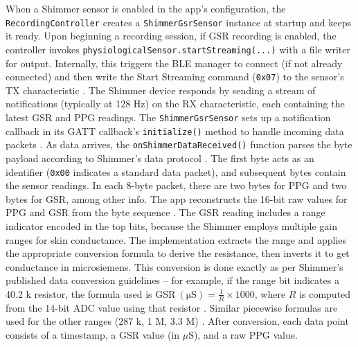 When a Shimmer sensor is enabled in the app's configuration, the \texttt{RecordingController} creates a \texttt{ShimmerGsrSensor} instance at startup and keeps it ready. Upon beginning a recording session, if GSR recording is enabled, the controller invokes \texttt{physiologicalSensor.startStreaming(...)} with a file writer for output. Internally, this triggers the BLE manager to connect (if not already connected) and then write the Start Streaming command (\texttt{0x07}) to the sensor's TX characteristic \cite{ref15}. The Shimmer device responds by sending a stream of notifications (typically at 128 Hz) on the RX characteristic, each containing the latest GSR and PPG readings. The \texttt{ShimmerGsrSensor} sets up a notification callback in its GATT callback's \texttt{initialize()} method to handle incoming data packets \cite{ref15}. As data arrives, the \texttt{onShimmerDataReceived()} function parses the byte payload according to Shimmer's data protocol \cite{ref8}. The first byte acts as an identifier (\texttt{0x00} indicates a standard data packet), and subsequent bytes contain the sensor readings. In each 8-byte packet, there are two bytes for PPG and two bytes for GSR, among other info. The app reconstructs the 16-bit raw values for PPG and GSR from the byte sequence \cite{ref8}. The GSR reading includes a range indicator encoded in the top bits, because the Shimmer employs multiple gain ranges for skin conductance. The implementation extracts the range and applies the appropriate conversion formula to derive the resistance, then inverts it to get conductance in microsiemens. This conversion is done exactly as per Shimmer's published data conversion guidelines \cite{ref8} -- for example, if the range bit indicates a 40.2 k\Omega{} resistor, the formula used is $\mathrm{GSR\ (\mu S)} = \frac{1}{R} \times 1000$, where $R$ is computed from the 14-bit ADC value using that resistor \cite{ref8}. Similar piecewise formulas are used for the other ranges (287 k\Omega{}, 1 M\Omega{}, 3.3 M\Omega{}) \cite{ref8}. After conversion, each data point consists of a timestamp, a GSR value (in $\mu$S), and a raw PPG value.


